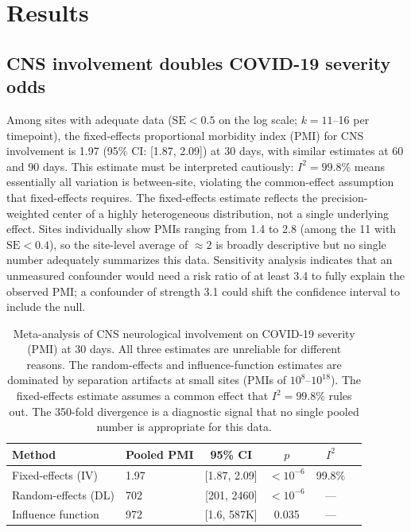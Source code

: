 \documentclass{article}
\begin{document}
\section{Results}

\subsection{CNS involvement doubles COVID-19 severity odds}

Among sites with adequate data ($\text{SE} < 0.5$ on the log scale; $k = 11$--16 per timepoint), the fixed-effects proportional morbidity index (PMI) for CNS involvement is 1.97 (95\% CI: [1.87, 2.09]) at 30 days, with similar estimates at 60 and 90 days.
This estimate must be interpreted cautiously: $I^2 = 99.8\%$ means essentially all variation is between-site, violating the common-effect assumption that fixed-effects requires.
The fixed-effects estimate reflects the precision-weighted center of a highly heterogeneous distribution, not a single underlying effect.
Sites individually show PMIs ranging from 1.4 to 2.8 (among the 11 with $\text{SE} < 0.4$), so the site-level average of $\approx 2$ is broadly descriptive but no single number adequately summarizes this data.
Sensitivity analysis \cite{vanderweele2017} indicates that an unmeasured confounder would need a risk ratio of at least 3.4 to fully explain the observed PMI; a confounder of strength 3.1 could shift the confidence interval to include the null.

\begin{table}[t]
\centering
\caption{Meta-analysis of CNS neurological involvement on COVID-19 severity (PMI) at 30 days. All three estimates are unreliable for different reasons. The random-effects and influence-function estimates are dominated by separation artifacts at small sites (PMIs of $10^{8}$--$10^{18}$). The fixed-effects estimate assumes a common effect that $I^2 = 99.8\%$ rules out. The 350-fold divergence is a diagnostic signal that no single pooled number is appropriate for this data.}
\label{tab:meta}
\begin{tabular}{llcccc}
\toprule
Method & Pooled PMI & 95\% CI & $p$ & $I^2$ \\
\midrule
Fixed-effects (IV) & 1.97 & [1.87, 2.09] & $< 10^{-6}$ & 99.8\% \\
Random-effects (DL) & 702 & [201, 2460] & $< 10^{-6}$ & --- \\
Influence function & 972 & [1.6, 587K] & 0.035 & --- \\
\bottomrule
\end{tabular}
\end{table}
\end{document}
